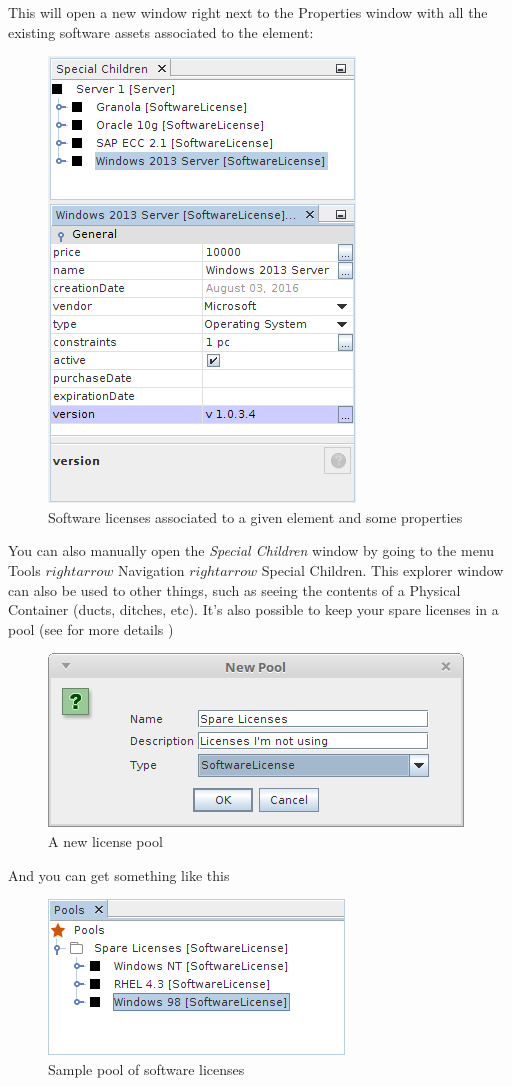 \documentclass[a4paper]{article}
\begin{document}
	    This  will  open a new window  right  next  to the  Properties  window  with  all  the existing software  assets associated to the element:
	    \begin{figure}[h!]
	    	\centering
	    	\includegraphics[width=0.4\linewidth]{img/software_asset_license_window.png}
	    	\caption{Software licenses associated to a given element and some properties}
	    	\label{fig:software_asset_license_window}
	    \end{figure}
	    
	    You  can  also  manually  open  the  \textit{Special  Children}  window  by  going  to  the  menu  Tools $rightarrow$ Navigation $rightarrow$ Special Children. This explorer  window  can  also  be  used  to  other  things, such  as seeing  the contents  of  a Physical  Container  (ducts,  ditches, etc).  
	    \newline
	    It’s  also  possible  to  keep  your  spare  licenses  in  a  pool  (see for more details \textbf{})
	    \begin{figure}[h!]
	    	\centering
	    	\includegraphics[width=0.5\linewidth]{img/software_asset_pool_liceses_not_used.png}
	    	\caption{A new license pool}
	    	\label{fig:software_asset_pool_liceses_not_used}
	    \end{figure}

	    And you can get something like this
		\begin{figure}[h!]
			\centering
			\includegraphics[width=0.4\linewidth]{img/software_asset_licences_not_used.png}
			\caption{Sample pool of software licenses}
			\label{fig:software_asset_licences_not_used}
		\end{figure}	
		
\end{document}
